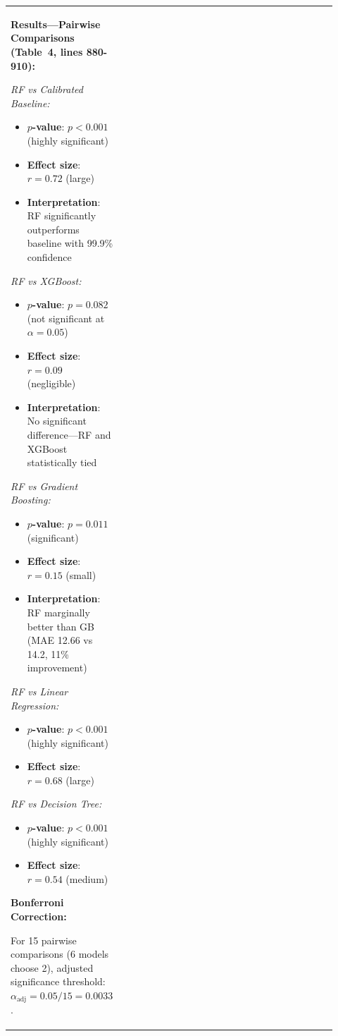 \documentclass[11pt,a4paper]{article}
\begin{document}
\begin{longtable}{>{\raggedright\arraybackslash}p{0.26\linewidth}|>{\raggedright\arraybackslash}p{0.44\linewidth}|>{\raggedright\arraybackslash}p{0.22\linewidth}}
\textbf{Results---Pairwise Comparisons (Table~4, lines 880-910):}

\textit{RF vs Calibrated Baseline:}
\begin{itemize}
    \item \textbf{$p$-value}: $p < 0.001$ (highly significant)
    \item \textbf{Effect size}: $r = 0.72$ (large)
    \item \textbf{Interpretation}: RF significantly outperforms baseline with 99.9\% confidence
\end{itemize}

\textit{RF vs XGBoost:}
\begin{itemize}
    \item \textbf{$p$-value}: $p = 0.082$ (not significant at $\alpha=0.05$)
    \item \textbf{Effect size}: $r = 0.09$ (negligible)
    \item \textbf{Interpretation}: No significant difference---RF and XGBoost statistically tied
\end{itemize}

\textit{RF vs Gradient Boosting:}
\begin{itemize}
    \item \textbf{$p$-value}: $p = 0.011$ (significant)
    \item \textbf{Effect size}: $r = 0.15$ (small)
    \item \textbf{Interpretation}: RF marginally better than GB (MAE 12.66 vs 14.2, 11\% improvement)
\end{itemize}

\textit{RF vs Linear Regression:}
\begin{itemize}
    \item \textbf{$p$-value}: $p < 0.001$ (highly significant)
    \item \textbf{Effect size}: $r = 0.68$ (large)
\end{itemize}

\textit{RF vs Decision Tree:}
\begin{itemize}
    \item \textbf{$p$-value}: $p < 0.001$ (highly significant)
    \item \textbf{Effect size}: $r = 0.54$ (medium)
\end{itemize}

\textbf{Bonferroni Correction:}

For 15 pairwise comparisons (6 models choose 2), adjusted significance threshold: $\alpha_{\text{adj}} = 0.05/15 = 0.0033$.


\end{longtable}
\end{document}
